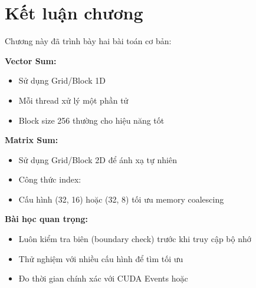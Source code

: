 \section{Kết luận chương}

Chương này đã trình bày hai bài toán cơ bản:

\textbf{Vector Sum:}
\begin{itemize}
    \item Sử dụng Grid/Block 1D
    \item Mỗi thread xử lý một phần tử
    \item Block size 256 thường cho hiệu năng tốt
\end{itemize}

\textbf{Matrix Sum:}
\begin{itemize}
    \item Sử dụng Grid/Block 2D để ánh xạ tự nhiên
    \item Công thức index: 
    \item Cấu hình (32, 16) hoặc (32, 8) tối ưu memory coalescing
\end{itemize}

\textbf{Bài học quan trọng:}
\begin{itemize}
    \item Luôn kiểm tra biên (boundary check) trước khi truy cập bộ nhớ
    \item Thử nghiệm với nhiều cấu hình để tìm tối ưu
    \item Đo thời gian chính xác với CUDA Events hoặc 
\end{itemize}
